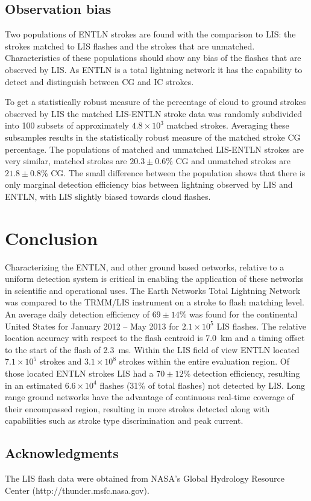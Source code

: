 \subsection{Observation bias}

Two populations of ENTLN strokes are found with the comparison to LIS: the strokes matched to LIS flashes and the strokes that are unmatched.
Characteristics of these populations should show any bias of the flashes that are observed by LIS.
As ENTLN is a total lightning network it has the capability to detect and distinguish between CG and IC strokes.

To get a statistically robust measure of the percentage of cloud to ground strokes observed by LIS the matched LIS-ENTLN stroke data was randomly subdivided into 100 subsets of approximately $4.8\times10^3$ matched strokes.
Averaging these subsamples results in the statistically robust measure of the matched stroke CG percentage.
The populations of matched and unmatched LIS-ENTLN strokes are very similar, matched strokes are $20.3\pm0.6$\% CG and unmatched strokes are $21.8\pm0.8$\% CG.
The small difference between the population shows that there is only marginal detection efficiency bias between lightning observed by LIS and ENTLN, with LIS slightly biased towards cloud flashes.

\section{Conclusion}

Characterizing the ENTLN, and other ground based networks, relative to a uniform detection system is critical in enabling the application of these networks in scientific and operational uses.
The Earth Networks Total Lightning Network was compared to the TRMM/LIS instrument on a stroke to flash matching level.
An average daily detection efficiency of $69\pm 14$\% was found for the continental United States for January 2012 -- May 2013 for $2.1 \times 10^5$ LIS flashes.
The relative location accuracy with respect to the flash centroid is 7.0~km and a timing offset to the start of the flash of 2.3~ms.
Within the LIS field of view ENTLN located $7.1\times 10^5$ strokes and $3.1\times10^8$ strokes within the entire evaluation region.
Of those located ENTLN strokes LIS had a $70 \pm 12$\% detection efficiency, resulting in an estimated $6.6 \times 10^4$ flashes (31\% of total flashes) not detected by LIS.
Long range ground networks have the advantage of continuous real-time coverage of their encompassed region, resulting in more strokes detected along with capabilities such as stroke type discrimination and peak current.

\subsection*{Acknowledgments}

The LIS flash data were obtained from NASA's Global Hydrology Resource Center (http://thunder.msfc.nasa.gov).
